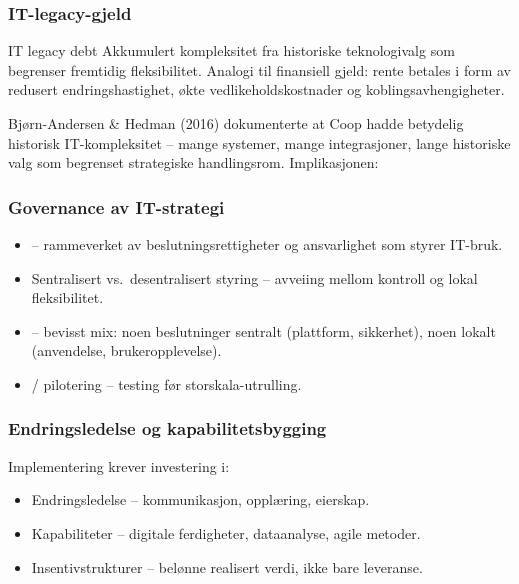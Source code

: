 \subsubsection*{IT-legacy-gjeld}

\begin{definition}{IT legacy debt}
Akkumulert kompleksitet fra historiske teknologivalg som begrenser fremtidig
fleksibilitet. Analogi til finansiell gjeld: rente betales i form av redusert
endringshastighet, økte vedlikeholdskostnader og koblingsavhengigheter.
\end{definition}

Bjørn-Andersen \& Hedman (2016) dokumenterte at Coop hadde betydelig
historisk IT-kompleksitet -- mange systemer, mange integrasjoner, lange
historiske valg som begrenset strategiske handlingsrom. Implikasjonen:

\subsubsection*{Governance av IT-strategi}
\begin{itemize}
  \item {} -- rammeverket av beslutningsrettigheter og
    ansvarlighet som styrer IT-bruk.
  \item Sentralisert vs.\ desentralisert styring -- avveiing mellom kontroll
    og lokal fleksibilitet.
  \item {} -- bevisst mix: noen beslutninger sentralt
    (plattform, sikkerhet), noen lokalt (anvendelse, brukeropplevelse).
  \item {} / pilotering -- testing før storskala-utrulling.
\end{itemize}

\subsubsection*{Endringsledelse og kapabilitetsbygging}
Implementering krever investering i:
\begin{itemize}
  \item Endringsledelse -- kommunikasjon, opplæring, eierskap.
  \item Kapabiliteter -- digitale ferdigheter, dataanalyse, agile metoder.
  \item Insentivstrukturer -- belønne realisert verdi, ikke bare leveranse.
\end{itemize}

